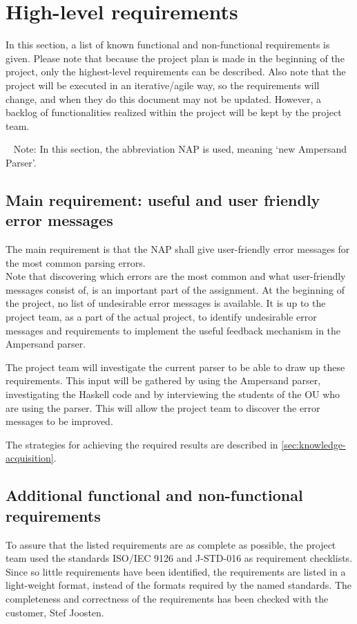 \section{High-level requirements}
\label{sec:requirements}
In this section, a list of known functional and non-functional requirements is given.
Please note that because the project plan is made in the beginning of the project, only the highest-level requirements can be described.
Also note that the project will be executed in an iterative/agile way, so the requirements will change, and when they do this document may not be updated.
However, a backlog of functionalities realized within the project will be kept by the project team.

~\newline\noindent
Note: In this section, the abbreviation NAP is used, meaning `new Ampersand Parser'.
%

\subsection{Main requirement: useful and user friendly error messages}
The main requirement is that the NAP shall give user-friendly error messages for the most common parsing errors.\\
Note that discovering which errors are the most common and what user-friendly messages consist of, is an important part of the assignment.
At the beginning of the project, no list of undesirable error messages is available.
It is up to the project team, as a part of the actual project, to identify undesirable error messages and requirements to implement the useful feedback mechanism in the Ampersand parser.

The project team will investigate the current parser to be able to draw up these requirements.
This input will be gathered by using the Ampersand parser, investigating the Haskell code and by interviewing the students of the OU who are using the parser.
This will allow the project team to discover the error messages to be improved.

The strategies for achieving the required results are described in \autoref{sec:knowledge-acquisition}.

\subsection{Additional functional and non-functional requirements}
To assure that the listed requirements are as complete as possible, the project team used the standards ISO/IEC 9126 \cite{iso-9126} and J-STD-016 \cite{jstd-016} as requirement checklists.
Since so little requirements have been identified, the requirements are listed in a light-weight format, instead of the formats required by the named standards.
The completeness and correctness of the requirements has been checked with the customer, Stef Joosten.

